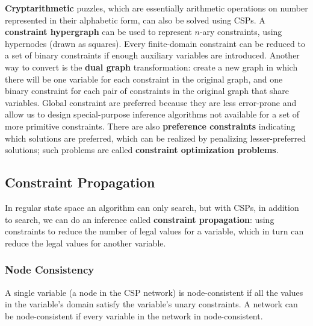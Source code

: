 \documentclass[twoside]{article}
\begin{document}
\textbf{Cryptarithmetic} puzzles, which are essentially arithmetic operations
on number represented in their alphabetic form, can also be solved using CSPs.
A \textbf{constraint hypergraph} can be used to represent \(n\)-ary constraints,
using hypernodes (drawn as squares). Every finite-domain constraint can be 
reduced to a set of binary constraints if enough auxiliary variables are 
introduced. Another way to convert is the \textbf{dual graph} transformation:
create a new graph in which there will be one variable for each constraint in 
the original graph, and one binary constraint for each pair of constraints in
the original graph that share variables. Global constraint are preferred because
they are less error-prone and allow us to design special-purpose inference 
algorithms not available for a set of more primitive constraints. There are
also \textbf{preference constraints} indicating which solutions are preferred,
which can be realized by penalizing lesser-preferred solutions; such problems
are called \textbf{constraint optimization problems}.
\subsection{Constraint Propagation}
In regular state space an algorithm can only search, but with CSPs, in addition
to search, we can do an inference called \textbf{constraint propagation}: using
constraints to reduce the number of legal values for a variable, which in turn 
can reduce the legal values for another variable.
\subsubsection{Node Consistency}
A single variable (a node in the CSP network) is node-consistent if all the 
values in the variable's domain satisfy the variable's unary constraints. A 
network can be node-consistent if every variable in the network in node-consistent.
\end{document}
